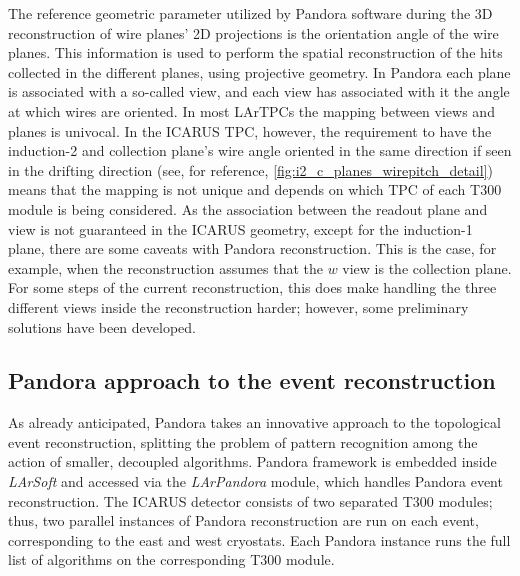 The reference geometric parameter utilized by Pandora software during the 3D reconstruction of wire planes’ 2D projections is the orientation angle of the wire planes. This information is used to perform the spatial reconstruction of the hits collected in the different planes, using projective geometry. In Pandora each plane is associated with a so-called view, and each view has associated with it the angle at which wires are oriented. In most LArTPCs the mapping between views and planes is univocal. In the ICARUS TPC, however, the requirement to have the induction-2 and collection plane's wire angle oriented in the same direction if seen in the drifting direction (see, for reference, \autoref{fig:i2_c_planes_wirepitch_detail}) means that the mapping is not unique and depends on which TPC of each T300 module is being considered. As the association between the readout plane and view is not guaranteed in the ICARUS geometry, except for the induction-1 plane, there are some caveats with Pandora reconstruction. This is the case, for example, when the reconstruction assumes that the $w$ view is the collection plane. For some steps of the current reconstruction, this does make handling the three different views inside the reconstruction harder; however, some preliminary solutions have been developed. 

\subsection{Pandora approach to the event reconstruction} \label{sec:Pandora}

As already anticipated, Pandora takes an innovative approach to the topological event reconstruction, splitting the problem of pattern recognition among the action of smaller, decoupled algorithms. Pandora framework is embedded inside \emph{LArSoft} and accessed via the \emph{LArPandora} module, which handles Pandora event reconstruction. The ICARUS detector consists of two separated T300 modules; thus, two parallel instances of Pandora reconstruction are run on each event, corresponding to the east and west cryostats. Each Pandora instance runs the full list of algorithms on the corresponding T300 module. 

